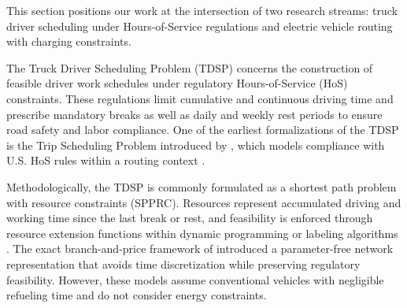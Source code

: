 \documentclass[3p,11pt,authoryear]{elsarticle}  %
\begin{document}

This section positions our work at the intersection of two research streams: truck driver scheduling under Hours-of-Service regulations and electric vehicle routing with charging constraints.

The Truck Driver Scheduling Problem (TDSP) concerns the construction of feasible driver work schedules under regulatory Hours-of-Service (HoS) constraints. These regulations limit cumulative and continuous driving time and prescribe mandatory breaks as well as daily and weekly rest periods to ensure road safety and labor compliance. One of the earliest formalizations of the TDSP is the Trip Scheduling Problem introduced by \citet{archetti2009trip}, which models compliance with U.S. HoS rules within a routing context \citep{goel2012minimum, goel2012truck}.

Methodologically, the TDSP is commonly formulated as a shortest path problem with resource constraints (SPPRC). Resources represent accumulated driving and working time since the last break or rest, and feasibility is enforced through resource extension functions within dynamic programming or labeling algorithms \citep{goel2010truck, drexl2010labelling}. The exact branch-and-price framework of \citet{goel2017exact} introduced a parameter-free network representation that avoids time discretization while preserving regulatory feasibility. However, these models assume conventional vehicles with negligible refueling time and do not consider energy constraints.
\end{document}
